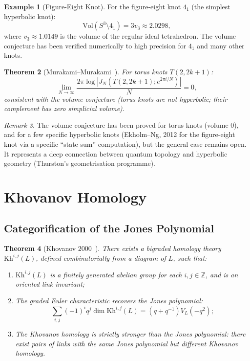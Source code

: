 \documentclass[12pt,a4paper]{amsart}
\newtheorem{theorem}{Theorem}[section]
\theoremstyle{definition}
\newtheorem{example}[theorem]{Example}
\theoremstyle{remark}
\newtheorem{remark}[theorem]{Remark}
\newcommand{\Z}{\mathbb{Z}}
\begin{document}
\begin{example}[Figure-Eight Knot]
For the figure-eight knot $4_1$ (the simplest hyperbolic knot):
\[
    \mathrm{Vol}(S^3 \setminus 4_1) = 3v_3 \approx 2.0298,
\]
where $v_3 \approx 1.0149$ is the volume of the regular ideal tetrahedron.
The volume conjecture has been verified numerically to high precision for
$4_1$ and many other knots.
\end{example}

\begin{theorem}[Murakami--Murakami~\cite{MurakamiMurakami2001}]
For torus knots $T(2,2k+1)$:
\[
    \lim_{N \to \infty} \frac{2\pi \log |J_N(T(2,2k+1); e^{2\pi i/N})|}{N} = 0,
\]
consistent with the volume conjecture (torus knots are not hyperbolic;
their complement has zero simplicial volume).
\end{theorem}

\begin{remark}
The volume conjecture has been proved for torus knots (volume 0), and for
a few specific hyperbolic knots (Ekholm--Ng, 2012 for the figure-eight knot
via a specific ``state sum'' computation), but the general case remains open.
It represents a deep connection between quantum topology and hyperbolic
geometry (Thurston's geometrisation programme).
\end{remark}

\section{Khovanov Homology}

\subsection{Categorification of the Jones Polynomial}

\begin{theorem}[Khovanov 2000~\cite{Khovanov2000}]
\label{thm:Khovanov}
There exists a bigraded homology theory $\mathrm{Kh}^{i,j}(L)$, defined
combinatorially from a diagram of $L$, such that:
\begin{enumerate}[label=\roman*)]
\item $\mathrm{Kh}^{i,j}(L)$ is a finitely generated abelian group for
      each $i, j \in \Z$, and is an oriented link invariant;
\item The graded Euler characteristic recovers the Jones polynomial:
      \[
          \sum_{i,j} (-1)^i q^j \dim \mathrm{Kh}^{i,j}(L)
          = (q + q^{-1}) V_L(-q^2);
      \]
\item The Khovanov homology is strictly stronger than the Jones polynomial:
      there exist pairs of links with the same Jones polynomial but
      different Khovanov homology.
\end{enumerate}
\end{theorem}
\end{document}
